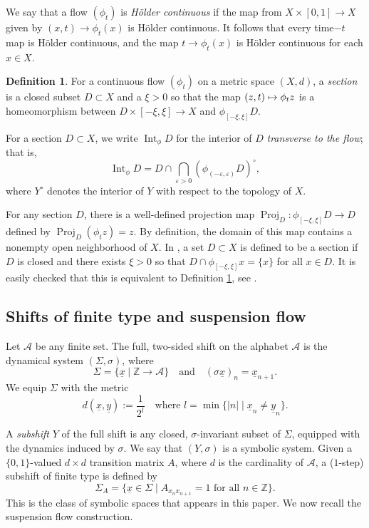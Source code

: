 \documentclass[11pt]{article}
\let\mathcal\mathscr
\let\epsilon\varepsilon
\let\sep\mid
\def\mto{\mathchoice{\longmapsto}{\mapsto}{\mapsto}{\mapsto}}
\theoremstyle{definition}
\newtheorem{defn}[thm]{Definition}
\numberwithin{equation}{section}
\DeclareMathOperator{\Int}{Int}
\DeclareMathOperator{\Proj}{Proj}
\begin{document}
We say that a flow $(\phi_t)$ is \emph{Hölder continuous} if the map from $X \times [0,1] \to X$ given by $(x,t) \to \phi_t(x)$ is Hölder continuous. It follows that every time$-t$ map is Hölder continuous, and the map $t \to \phi_t(x)$ is Hölder continuous for each $x\in X$.

\begin{defn}\label{defn:section}
For a continuous flow $( \phi_t )$ on a metric space $(X,d)$, a \emph{section} is a closed subset $D\subset X$ and a $\xi>0$ so that the map $(z,t) \mto \phi_tz$ is a homeomorphism between $D \times [-\xi, \xi] \to X$ and $\phi_{[-\xi,\xi]}D$.
\end{defn}

For a section $D \subset X$, we write $\Int_\phi D$ for the interior of $D$ \emph{transverse to the flow}; that is,
\[\Int_\phi D = D \cap \bigcap_{\epsilon>0}(\phi_{(-\epsilon,\epsilon)}D)^\circ,\]
where $Y^\circ$ denotes the interior of $Y$ with respect to the topology of $X$.

For any section $D$, there is a well-defined projection map $\Proj_D: \phi_{[-\xi,\xi]}D \to D$ defined by $\Proj_D(\phi_tz) =z$. By definition, the domain of this map contains a nonempty open neighborhood of $X$. In \cite{BW}, a set $D \subset X$ is defined to be a section if $D$ is closed and there exists $\xi>0$ so that $D \cap \phi_{[-\xi,\xi]}x = \{x\}$ for all $x \in D$. It is easily checked that this is equivalent to Definition \ref{defn:section}, see \cite[\S 5]{BW}.

\subsection{Shifts of finite type and suspension flow}

Let $\mathcal{A}$ be any finite set. The full, two-sided shift on the alphabet $\mathcal{A}$ is the dynamical system $(\Sigma, \sigma)$, where
\[ \Sigma = \{ \underline x\sep \mathbb{Z} \to \mathcal{A} \} \quad \mbox{and} \quad (\sigma \underline x)_n = \underline x_{n+1}. \]
We equip $\Sigma$ with the metric
\[ d(\underline x, \underline y) := \frac{1}{2^l} \quad \mbox{where } l = \min\{|n|\sep\underline x_n \neq \underline y_n\}. \]

A \emph{subshift} $Y$ of the full shift is any closed, $\sigma$-invariant subset of $\Sigma$, equipped with the dynamics induced by $\sigma$. We say that $(Y, \sigma)$ is a symbolic system. Given a $\{0,1\}$-valued $d \times d $ transition matrix $A$, where $d$ is the cardinality of $\mathcal{A}$, a ($1$-step) subshift of finite type is defined by
\[
\Sigma_A = \{\underline x \in \Sigma \sep A_{x_n x_{n+1}}=1 \mbox{ for all } n\in \mathbb{Z}\}.
\]
This is the class of symbolic spaces that appears in this paper. We now recall the suspension flow construction.
\end{document}
